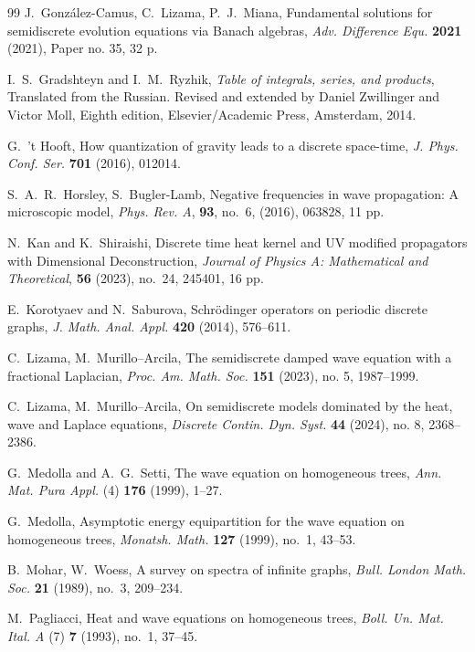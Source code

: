 \documentclass[12pt]{amsart}
\numberwithin{equation}{section}
\theoremstyle{boldremark}
\begin{document}
\begin{thebibliography}{99}
 J.~Gonz\'alez-Camus, C.~Lizama, P.~J.~Miana, Fundamental solutions for semidiscrete evolution equations via Banach algebras, \emph{Adv. Difference Equ.} \textbf{2021} (2021), Paper no. 35, 32 p.

 I.~S.~Gradshteyn and I.~M.~Ryzhik, \emph{Table of integrals, series, and products}, Translated from the Russian. Revised and extended by Daniel Zwillinger and Victor Moll, Eighth edition, Elsevier/Academic Press, Amsterdam, 2014.

  G.~'t Hooft, How quantization of gravity leads to a discrete space-time,  \emph{J. Phys. Conf. Ser.} \textbf{701} (2016), 012014. 

 S.~A.~R.~Horsley, S.~Bugler-Lamb, Negative frequencies in wave propagation: A microscopic model, \emph{Phys. Rev. A}, \textbf{93}, no.~6, (2016), 063828, 11 pp.

 N.~Kan and K.~Shiraishi, Discrete time heat kernel and UV modified propagators with Dimensional Deconstruction, \emph{Journal of Physics A: Mathematical and Theoretical}, \textbf{56} (2023), no.~24, 245401, 16 pp.

 E.~Korotyaev and N.~Saburova, Schr\"odinger operators on periodic discrete graphs, \emph{J. Math. Anal. Appl.} \textbf{420} (2014), 576--611.

 C.~Lizama, M.~Murillo--Arcila, The semidiscrete damped wave equation with a fractional Laplacian, \emph{Proc. Am. Math. Soc.} \textbf{151} (2023), no. 5, 1987--1999.

 C.~Lizama, M.~Murillo--Arcila, On semidiscrete models dominated by the heat, wave and Laplace equations, \emph{Discrete Contin. Dyn. Syst.} \textbf{44} (2024), no. 8, 2368--2386.

 G.~Medolla and A.~G.~Setti, The wave equation on
homogeneous trees, \emph{Ann. Mat. Pura Appl.} (4) \textbf{176} (1999), 1--27.

 G.~Medolla, Asymptotic energy equipartition for the wave equation on homogeneous trees, \emph{Monatsh. Math.} \textbf{127} (1999), no.~1, 43--53.

 B.~Mohar, W.~Woess, A survey on spectra of infinite graphs, \emph{Bull. London Math. Soc.} \textbf{21} (1989), no.~3, 209--234.

 M.~Pagliacci, Heat and wave equations on homogeneous trees, \emph{Boll. Un. Mat. Ital. A} (7) \textbf{7} (1993), no.~1, 37--45.


\end{thebibliography}
\end{document}
